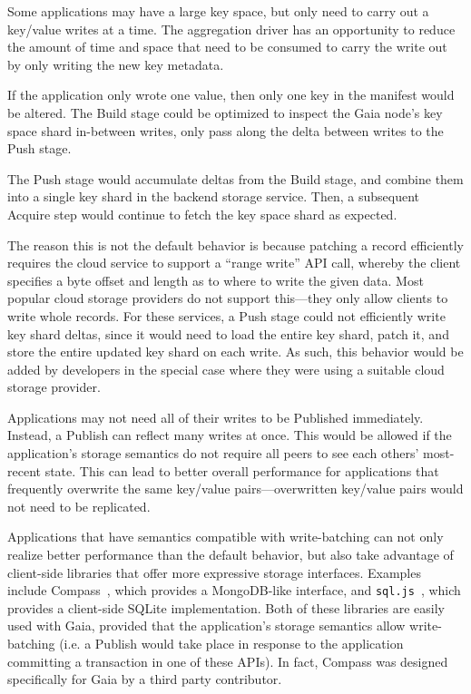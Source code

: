\hfill \break
{}
\hfill \break

Some applications may have a large key space, but only need to carry out a
key/value writes at a time.
The aggregation driver has an opportunity to reduce the amount of time and space that
need to be consumed to carry the write out by only writing the new key metadata.

If the application only wrote one value, then only one key in the manifest would
be altered.  The Build stage could be optimized to inspect the Gaia node's 
key space shard in-between writes, only pass along the delta between writes
to the Push stage.

The Push stage would accumulate deltas from the Build stage, and combine them
into a single key shard in the backend storage service.  Then, a subsequent
Acquire step would continue to fetch the key space shard as expected.

The reason this is not the default behavior is because patching a record
efficiently requires the cloud service to support a ``range write''
API call, whereby the client specifies a byte offset and length as to where to
write the given data.  Most popular cloud storage providers do not support
this---they only allow clients to write whole records.  For these services,
a Push stage could not efficiently write key shard deltas, since it would need
to load the entire key shard, patch it, and store the entire updated key shard
on each write.  As such, this behavior would be added by developers in the
special case where they were using a suitable cloud storage provider.

\hfill \break
{}
\hfill \break

Applications may not need all of their writes to be Published immediately.
Instead, a Publish can reflect many writes at once.  This would be allowed if
the application's storage semantics do not require all peers to see each others'
most-recent state.  This can lead to better overall performance for applications
that frequently overwrite the same key/value pairs---overwritten key/value pairs
would not need to be replicated.

Applications that have semantics compatible with write-batching can not only
realize better performance than the default behavior, but also take advantage of
client-side libraries that offer more expressive storage interfaces.
Examples include Compass~\cite{blockstack-compass}, which provides a
MongoDB-like interface, and \texttt{sql.js}~\cite{sql.js}, which provides a
client-side SQLite implementation.  Both of these libraries are easily used with
Gaia, provided that the application's storage semantics allow write-batching
(i.e. a Publish would take place in response to the application committing a
transaction in one of these APIs).  In fact, Compass was designed specifically
for Gaia by a third party contributor.

